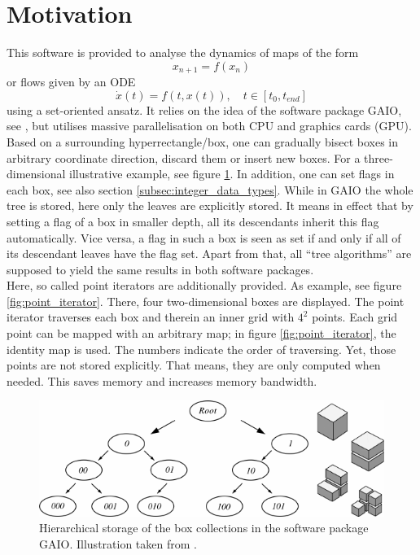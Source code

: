 \documentclass[a4paper,10pt,fleqn]{article}
\begin{document}
\section{Motivation} \label{sec:motivation}

This software is provided to analyse the dynamics of maps of the form
\begin{equation} \label{eq:map}
x_{n+1} = f \left( x_n \right)
\end{equation}
or flows given by an ODE
\begin{equation} \label{eq:flow}
\dot{x} \left( t \right) = f \left( t, x \left( t \right) \right), \quad t \in \left[ t_0, t_{end} \right]
\end{equation}
using a set-oriented ansatz. It relies on the idea of the software package GAIO, see \cite{dellnitz2001algorithms}, but utilises massive parallelisation on both CPU and graphics cards (GPU).\\
Based on a surrounding hyperrectangle/box, one can gradually bisect boxes in arbitrary coordinate direction, discard them or insert new boxes. For a three-dimensional illustrative example, see figure \ref{fig:box_tree}. In addition, one can set flags in each box, see also section \ref{subsec:integer_data_types}. While in GAIO the whole tree is stored, here only the leaves are explicitly stored. It means in effect that by setting a flag of a box in smaller depth, all its descendants inherit this flag automatically. Vice versa, a flag in such a box is seen as set if and only if all of its descendant leaves have the flag set. Apart from that, all ``tree algorithms'' are supposed to yield the same results in both software packages.\\
Here, so called point iterators are additionally provided. As example, see figure \ref{fig:point_iterator}. There, four two-dimensional boxes are displayed. The point iterator traverses each box and therein an inner grid with $4^2$ points. Each grid point can be mapped with an arbitrary map; in figure \ref{fig:point_iterator}, the identity map is used. The numbers indicate the order of traversing. Yet, those points are not stored explicitly. That means, they are only computed when needed. This saves memory and increases memory bandwidth.
\begin{figure}
	\centering
	\includegraphics[width=0.75\linewidth]{pics/box_tree.pdf}
	\caption[Hierarchical storage of the box collections in the software package GAIO]{Hierarchical storage of the box collections in the software package GAIO. Illustration taken from \cite{dellnitz2002set}.}
	\label{fig:box_tree}
\end{figure}
\end{document}
